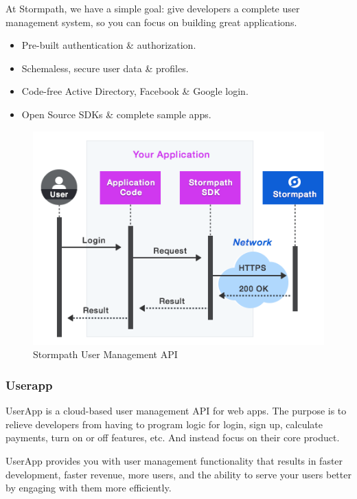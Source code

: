 At Stormpath, we have a simple goal: give developers a complete user management system, so you can focus on building great applications.\cite{usr_stormpath}

\begin{itemize}
\item Pre-built authentication \& authorization.
\item Schemaless, secure user data \& profiles.
\item Code-free Active Directory, Facebook \& Google login.
\item Open Source SDKs \& complete sample apps.
\end{itemize}

\begin {figure}[h]
\graphicspath{{images/chapter_USR/}}
\includegraphics[width=\textwidth]{stormpath}
\caption{Stormpath User Management API}
\end {figure}

\subsubsection{Userapp}

UserApp is a cloud-based user management API for web apps. The purpose is to relieve developers from having to program logic for login, sign up, calculate payments, turn on or off features, etc. And instead focus on their core product.

UserApp provides you with user management functionality that results in faster development, faster revenue, more users, and the ability to serve your users better by engaging with them more efficiently.\cite{usr_userapp}

